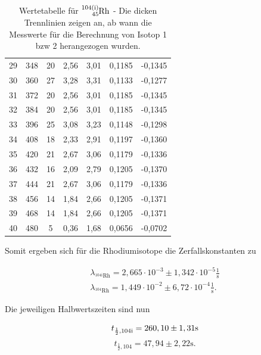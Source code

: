 \begin{table}[H]
\begin{tabular}{c|c|c|c|c|c|c}
29&	348&	20&	2,56&	3,01&	0,1185&	-0,1345\\
30&	360&	27&	3,28&	3,31&	0,1133&	-0,1277\\
31&	372&	20&	2,56&	3,01&	0,1185&	-0,1345\\
32&	384&	20&	2,56&	3,01&	0,1185&	-0,1345\\
33&	396&	25&	3,08&	3,23&	0,1148&	-0,1298\\
34&	408&	18&	2,33&	2,91&	0,1197&	-0,1360\\
35&	420&	21&	2,67&	3,06&	0,1179&	-0,1336\\
36&	432&	16&	2,09&	2,79&	0,1205&	-0,1370\\
37&	444&	21&	2,67&	3,06&	0,1179&	-0,1336\\
38&	456&	14&	1,84&	2,66&	0,1205&	-0,1371\\
39&	468&	14&	1,84&	2,66&	0,1205&	-0,1371\\
40&	480&	5&	0,36&	1,68&	0,0656&	-0,0702\\
\end{tabular}
\caption{Wertetabelle für $\ce{^{104(i)}_{45}Rh}$ - Die dicken Trennlinien zeigen an, ab wann die Messwerte für die Berechnung von Isotop 1 bzw 2 herangezogen wurden.}
\end{table}
\renewcommand{\arraystretch}{1}

Somit ergeben sich für die Rhodiumisotope die Zerfallskonstanten zu

\begin{align}
\lambda_{^{104\text{i}}\text{Rh}} = 2,665\cdot 10^{-3} \pm 1,342 \cdot 10^{-5} \frac{1}{\text{s}}\\
\lambda_{^{104}\text{Rh}} = 1,449 \cdot 10^{-2} \pm  6,72 \cdot 10^{-4} \frac{1}{\text{s}}.
\end{align}

Die jeweiligen Halbwertszeiten sind nun

\begin{equation}
   t_{\frac12,\text{104i}} = 260,10 \pm 1,31 \text{s}\\
\label{rh1}
\end{equation}
\begin{equation}
 t_{\frac12,\text{104}} = 47,94 \pm 2,22 \text{s}.
 \label{rh2}
\end{equation}

